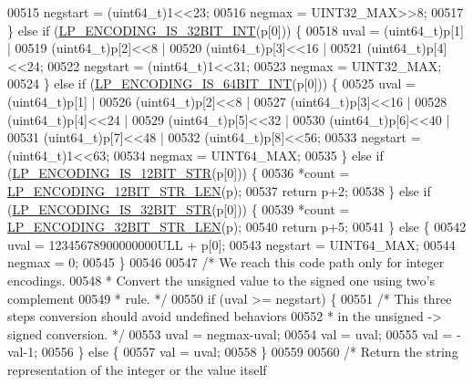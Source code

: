 \begin{DoxyCode}
00515         negstart = (uint64\_t)1<<23;
00516         negmax = UINT32\_MAX>>8;
00517     \} \textcolor{keywordflow}{else} \textcolor{keywordflow}{if} (\hyperlink{listpack_8c_a20bcd55f1ab106b65268239685b5b4bf}{LP\_ENCODING\_IS\_32BIT\_INT}(p[0])) \{
00518         uval = (uint64\_t)p[1] |
00519                (uint64\_t)p[2]<<8 |
00520                (uint64\_t)p[3]<<16 |
00521                (uint64\_t)p[4]<<24;
00522         negstart = (uint64\_t)1<<31;
00523         negmax = UINT32\_MAX;
00524     \} \textcolor{keywordflow}{else} \textcolor{keywordflow}{if} (\hyperlink{listpack_8c_a72330c9d476269713f068c215d605675}{LP\_ENCODING\_IS\_64BIT\_INT}(p[0])) \{
00525         uval = (uint64\_t)p[1] |
00526                (uint64\_t)p[2]<<8 |
00527                (uint64\_t)p[3]<<16 |
00528                (uint64\_t)p[4]<<24 |
00529                (uint64\_t)p[5]<<32 |
00530                (uint64\_t)p[6]<<40 |
00531                (uint64\_t)p[7]<<48 |
00532                (uint64\_t)p[8]<<56;
00533         negstart = (uint64\_t)1<<63;
00534         negmax = UINT64\_MAX;
00535     \} \textcolor{keywordflow}{else} \textcolor{keywordflow}{if} (\hyperlink{listpack_8c_a0bd78dfc25cc8b1956919beb5bf1dbcd}{LP\_ENCODING\_IS\_12BIT\_STR}(p[0])) \{
00536         *count = \hyperlink{listpack_8c_aee98309526d5001f5a402405166e65d8}{LP\_ENCODING\_12BIT\_STR\_LEN}(p);
00537         \textcolor{keywordflow}{return} p+2;
00538     \} \textcolor{keywordflow}{else} \textcolor{keywordflow}{if} (\hyperlink{listpack_8c_afb8bf77b7f72a33b662e74d855725ac9}{LP\_ENCODING\_IS\_32BIT\_STR}(p[0])) \{
00539         *count = \hyperlink{listpack_8c_a66a8fedf2589934bf597c7bea3f881ba}{LP\_ENCODING\_32BIT\_STR\_LEN}(p);
00540         \textcolor{keywordflow}{return} p+5;
00541     \} \textcolor{keywordflow}{else} \{
00542         uval = 12345678900000000ULL + p[0];
00543         negstart = UINT64\_MAX;
00544         negmax = 0;
00545     \}
00546 
00547     \textcolor{comment}{/* We reach this code path only for integer encodings.}
00548 \textcolor{comment}{     * Convert the unsigned value to the signed one using two's complement}
00549 \textcolor{comment}{     * rule. */}
00550     \textcolor{keywordflow}{if} (uval >= negstart) \{
00551         \textcolor{comment}{/* This three steps conversion should avoid undefined behaviors}
00552 \textcolor{comment}{         * in the unsigned -> signed conversion. */}
00553         uval = negmax-uval;
00554         val = uval;
00555         val = -val-1;
00556     \} \textcolor{keywordflow}{else} \{
00557         val = uval;
00558     \}
00559 
00560     \textcolor{comment}{/* Return the string representation of the integer or the value itself}

\end{DoxyCode}

